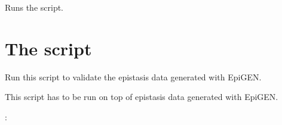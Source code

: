 \documentclass[a4paper,10pt,english]{sphinxhowto}
\begin{document}
\begin{fulllineitems}
\label{\detokenize{test_runtime:test_runtime.run_script}}
Runs the script.

\end{fulllineitems}



\section{The script }
\label{\detokenize{validate_simulated_data:module-validate_simulated_data}}\label{\detokenize{validate_simulated_data:the-script-validate-simulated-data-py}}\label{\detokenize{validate_simulated_data::doc}}
Run this script to validate the epistasis data generated with EpiGEN.

This script has to be run on top of epistasis data generated with EpiGEN.

:
\end{document}
